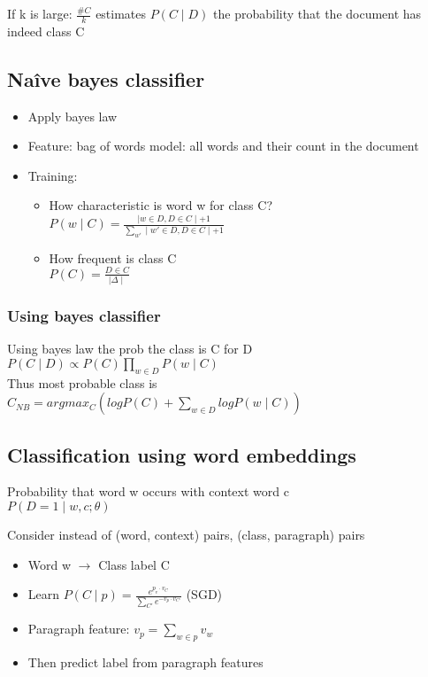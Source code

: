 If k is large: $ \frac{\#C}{k} $ estimates $ P(C \mid D) $ the
probability that the document has indeed class C

\subsection{Naîve bayes classifier}
\begin{itemize}
\item Apply bayes law
\item Feature: bag of words model: all words and their count in the
  document
\item Training:
  \begin{itemize}
  \item How characteristic is word w for class C? \\
    $ P(w \mid C) = \frac{\mid w \in D, D \in C \mid +
      1}{\sum_{w'}\mid w' \in D, D \in C \mid + 1} $
  \item How frequent is class C \\
    $ P(C) = \frac{D \in C}{\mid \Delta \mid} $
  \end{itemize}
\end{itemize}

\subsubsection{Using bayes classifier}
Using bayes law the prob the class is C for D \\
$ P(C \mid D) \propto P(C) \prod_{w \in D} P(w \mid C) $ \\
Thus most probable class is\\
$ C_{NB} = argmax_{C} (log P(C) + \sum_{w \in D} log P(w \mid C)) $

\subsection{Classification using word embeddings}

Probability that word w occurs with context word c \\
$ P(D = 1 \mid w,c ; \theta) $

Consider instead of (word, context) pairs, (class, paragraph) pairs
\begin{itemize}
\item Word w $ \rightarrow $ Class label C
\item Learn $ P(C \mid p)= \frac{e^{p_v \cdot v_C}}{\sum_{C'} e^{-v_p
      \cdot v_{C'}}} $ (SGD)
\item Paragraph feature: $ v_p = \sum_{w \in p} v_w $
\item Then predict label from paragraph features
\end{itemize}

